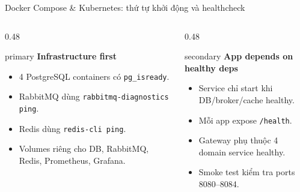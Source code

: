 \documentclass[aspectratio=169]{beamer}
\begin{document}
\begin{frame}{Docker Compose \& Kubernetes: thứ tự khởi động và healthcheck}
    \begin{columns}[T,onlytextwidth]
        \begin{column}{0.48\textwidth}
            \begin{claimbox}{primary}
                \textbf{Infrastructure first}
                \begin{itemize}\small
                    \item 4 PostgreSQL containers có \texttt{pg\_isready}.
                    \item RabbitMQ dùng \texttt{rabbitmq-diagnostics ping}.
                    \item Redis dùng \texttt{redis-cli ping}.
                    \item Volumes riêng cho DB, RabbitMQ, Redis, Prometheus, Grafana.
                \end{itemize}
            \end{claimbox}
        \end{column}
        \begin{column}{0.48\textwidth}
            \begin{claimbox}{secondary}
                \textbf{App depends on healthy deps}
                \begin{itemize}\small
                    \item Service chỉ start khi DB/broker/cache healthy.
                    \item Mỗi app expose \texttt{/health}.
                    \item Gateway phụ thuộc 4 domain service healthy.
                    \item Smoke test kiểm tra ports 8080--8084.
                \end{itemize}
            \end{claimbox}
        \end{column}
    \end{columns}
\end{frame}
\end{document}
